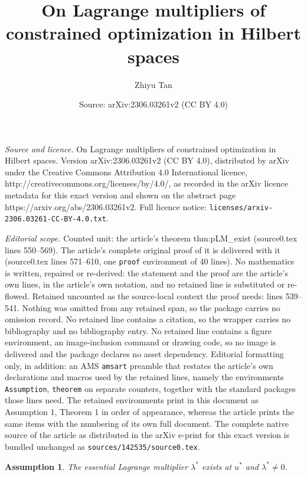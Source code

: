 \documentclass[10pt,a4paper]{amsart}
\title{On Lagrange multipliers of constrained optimization in Hilbert spaces}
\author{Zhiyu Tan}
\date{Source: arXiv:2306.03261v2 (CC BY 4.0)}
\newtheorem{Assumption}{Assumption}
\begin{document}
\maketitle

\noindent\emph{Source and licence.} On Lagrange multipliers of constrained optimization in Hilbert spaces. Version arXiv:2306.03261v2 (CC BY 4.0), distributed by arXiv under the Creative Commons Attribution 4.0 International licence, http://creativecommons.org/licenses/by/4.0/, as recorded in the arXiv licence metadata for this exact version and shown on the abstract page https://arxiv.org/abs/2306.03261v2. Full licence notice: \texttt{licenses/arxiv-2306.03261-CC-BY-4.0.txt}.\par\smallskip

\noindent\textit{Editorial scope.} Counted unit: the article's theorem thm:pLM\_exist (source0.tex lines 550--569). The article's complete original proof of it is delivered with it (source0.tex lines 571--610, one \texttt{proof} environment of 40 lines). No mathematics is written, repaired or re-derived: the statement and the proof are the article's own lines, in the article's own notation, and no retained line is substituted or re-flowed.  Retained uncounted as the source-local context the proof needs: lines 539--541.  Nothing was omitted from any retained span, so the package carries no omission record.  No retained line contains a citation, so the wrapper carries no bibliography and no bibliography entry.  No retained line contains a figure environment, an image-inclusion command or drawing code, so no image is delivered and the package declares no asset dependency.  Editorial formatting only, in addition: an AMS \texttt{amsart} preamble that restates the article's own declarations and macros used by the retained lines, namely the environments \texttt{Assumption}, \texttt{theorem} on separate counters, together with the standard packages those lines need.  The retained environments print in this document as Assumption 1, Theorem 1 in order of appearance, whereas the article prints the same items with the numbering of its own full document.  The complete native source of the article as distributed in the arXiv e-print for this exact version is bundled unchanged as \texttt{sources/142535/source0.tex}.
\begin{Assumption}\label{assum:e_elm}
The essential Lagrange multiplier $\lambda^*$ exists at $u^*$ and $\lambda^* \neq 0$.
\end{Assumption}
\end{document}
